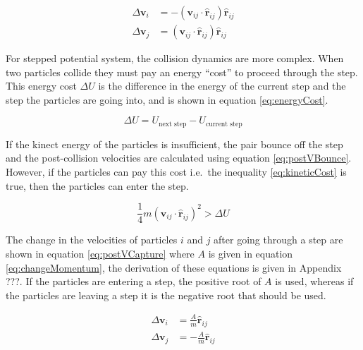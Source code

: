 \documentclass[12pt]{UoAthesis}
\begin{document}
\begin{subequations}
  \label{eq:postVBounce}
  \begin{align}
    \Delta\mathbf{v}_i &= -(\mathbf{v}_{ij}\cdot\mathbf{\hat{r}}_{ij})\mathbf{\hat{r}}_{ij} \\
    \Delta\mathbf{v}_j &= (\mathbf{v}_{ij}\cdot\mathbf{\hat{r}}_{ij})\mathbf{\hat{r}}_{ij}
  \end{align}
\end{subequations}

For stepped potential system, the collision dynamics are more complex.
When two particles collide they must pay an energy ``cost'' to proceed
through the step.  This energy cost $\Delta U$ is the difference in
the energy of the current step and the step the particles are going
into, and is shown in equation \eqref{eq:energyCost}.

\begin{equation}
  \label{eq:energyCost}
  \Delta U = U_{\text{next step}} - U_{\text{current step}}
\end{equation}

If the kinect energy of the particles is insufficient, the pair bounce
off the step and the post-collision velocities are calculated using
equation \eqref{eq:postVBounce}. However, if the particles can pay
this cost i.e.\ the inequality \eqref{eq:kineticCost} is true, then the
particles can enter the step.

\begin{equation}
\label{eq:kineticCost}
  \frac{1}{4}m(\mathbf{v}_{ij}\cdot\mathbf{\hat{r}}_{ij})^2 > \Delta U
\end{equation}

The change in the velocities of particles $i$ and $j$ after going
through a step are shown in equation \eqref{eq:postVCapture} where $A$
is given in equation \eqref{eq:changeMomentum}, the derivation of
these equations is given in Appendix ???.  If the particles are
entering a step, the positive root of $A$ is used, whereas if the
particles are leaving a step it is the negative root that should be
used.

\begin{subequations}
  \label{eq:postVCapture}
  \begin{align}
    \Delta\mathbf{v}_i &= \frac{A}{m} \mathbf{\hat{r}}_{ij} \\
    \Delta\mathbf{v}_j &= -\frac{A}{m}\mathbf{\hat{r}}_{ij}
  \end{align}
\end{subequations}
\end{document}
